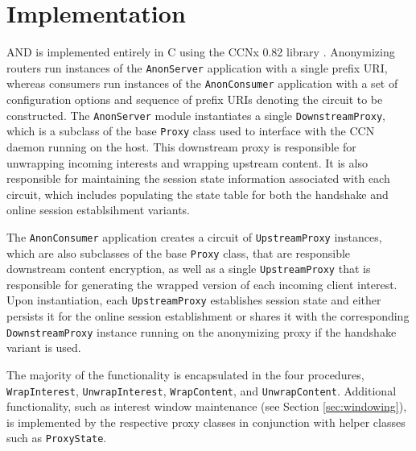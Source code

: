 \section{Implementation} \label{sec:introduction}
{\sf AND} is implemented entirely in C using the CCNx 0.82 library \cite{ccnx}. Anonymizing routers run instances of the {\tt AnonServer} application with a single prefix URI, whereas consumers run instances of the {\tt AnonConsumer} application with a set of configuration options and sequence of prefix URIs denoting the circuit to be constructed. The {\tt AnonServer} module instantiates a single {\tt DownstreamProxy}, which is a subclass of the base {\tt Proxy} class used to interface with the CCN daemon running on the host. This downstream proxy is responsible for unwrapping incoming interests and wrapping upstream content. It is also responsible for maintaining the session state information associated with each circuit, which includes populating the state table for both the handshake and online session establsihment variants. 

The {\tt AnonConsumer} application creates a circuit of {\tt UpstreamProxy} instances, which are also subclasses of the base {\tt Proxy} class, that are responsible downstream content encryption, as well as a single {\tt UpstreamProxy} that is responsible for generating the wrapped version of each incoming client interest. Upon instantiation, each {\tt UpstreamProxy} establishes session state and either persists it for the online session establishment or shares it with the corresponding {\tt DownstreamProxy} instance running on the anonymizing proxy if the handshake variant is used. 

The majority of the functionality is encapsulated in the four procedures, {\tt WrapInterest}, {\tt UnwrapInterest}, {\tt WrapContent}, and {\tt UnwrapContent}. Additional functionality, such as interest window maintenance (see Section \ref{sec:windowing}), is implemented by the respective proxy classes in conjunction with helper classes such as {\tt ProxyState}. 
